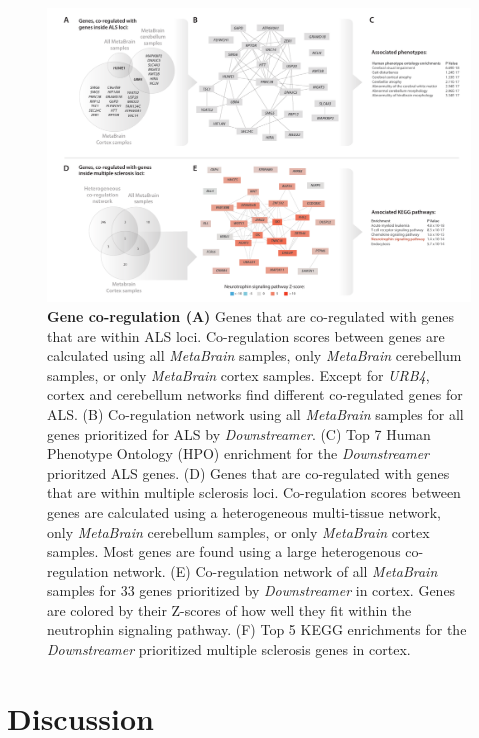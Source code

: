 \begin{figure}[H]
	\includegraphics[width=\textwidth]{chapters/chapter5-brain-eqtls/img/2021-02-11-fig7-ALSPrioritizedCoreGenes-v2.pdf}
	\caption{\textbf{Gene co-regulation (A)} Genes that are co-regulated with genes that are within ALS loci. Co-regulation scores between genes are calculated using all \emph{MetaBrain} samples, only \emph{MetaBrain} cerebellum samples, or only \emph{MetaBrain} cortex samples. Except for \emph{URB4}, cortex and cerebellum networks find different co-regulated genes for ALS. (B) Co-regulation network using all \emph{MetaBrain} samples for all genes prioritized for ALS by \emph{Downstreamer}. (C) Top 7 Human Phenotype Ontology (HPO) enrichment for the \emph{Downstreamer} prioritzed ALS genes. (D) Genes that are co-regulated with genes that are within multiple sclerosis loci. Co-regulation scores between genes are calculated using a heterogeneous multi-tissue network, only \emph{MetaBrain} cerebellum samples, or only \emph{MetaBrain} cortex samples. Most genes are found using a large heterogenous co-regulation network. (E) Co-regulation network of all \emph{MetaBrain} samples for 33 genes prioritized by \emph{Downstreamer} in cortex. Genes are colored by their Z-scores of how well they fit within the neutrophin signaling pathway. (F) Top 5 KEGG enrichments for the \emph{Downstreamer }prioritized multiple sclerosis genes in cortex.}
	\label{metabrain_fig7}
\end{figure}

\section{Discussion}


